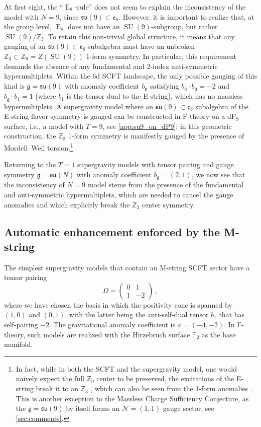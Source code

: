 \documentclass[11pt, a4paper]{article}
\newcommand*{\bbZ}{\ensuremath{\mathbb{Z}}}
\newcommand*{\bbF}{\ensuremath{\mathbb{F}}}
\newcommand*{\cN}{\ensuremath{\mathcal{N}}}
\newcommand*{\fkg}{\ensuremath{\mathfrak{g}}}
\DeclareMathOperator{\SU}{SU}
\DeclareMathOperator{\gE}{E}
\newcommand*{\fksu}{\ensuremath{\mathfrak{su}}}
\newcommand*{\fke}{\ensuremath{\mathfrak{e}}}
\begin{document}
At first sight, the ``$\gE_8$-rule'' does not seem to explain the inconsistency of the model with $N=9$, since $\fksu(9) \subset \fke_8$.
However, it is important to realize that, at the group level, $\gE_8$ does not have an $\SU(9)$-subgroup, but rather $\SU(9)/\bbZ_3$.
To retain this non-trivial global structure, it means that any gauging of an $\fksu(9) \subset \fke_8$ subalgebra must have an unbroken $\bbZ_3 \subset \bbZ_9 = Z(\SU(9))$ 1-form symmetry.
In particular, this requirement demands the absence of any fundamental and 2-index anti-symmetric hypermultiplets.
Within the 6d SCFT landscape, the only possible gauging of this kind is $\fkg = \fksu(9)$ with anomaly coefficient $b_\fkg$ satisfying $b_\fkg \cdot b_\fkg = -2$ and $b_\fkg \cdot b_1 = 1$ (where $b_1$ is the tensor dual to the E-string), which has no massless hypermultiplets.
A supergravity model where an $\fksu(9) \subset \fke_8$ subalgebra of the E-string flavor symmetry is gauged can be constructed in F-theory on a dP$_9$ surface, i.e., a model with $T=9$, see \cref{app:su9_on_dP9}; in this geometric construction, the $\bbZ_3$ 1-form symmetry is manifestly gauged by the presence of Mordell--Weil torsion.\footnote{In fact, while in both the SCFT and the supergravity model, one would naively expect the full $\bbZ_9$ center to be preserved, the excitations of the E-string break it to an $\bbZ_3$ \cite{Bhardwaj:2020phs}, which can also be seen from the 1-form anomalies \cite{Apruzzi:2020zot}.
This is another exception to the Massless Charge Sufficiency Conjecture, as the $\fkg = \fksu(9)$ by itself forms an $\cN = (1,1)$ gauge sector, see \cref{sec:comments}.
}


Returning to the $T=1$ supergravity models with tensor pairing  and gauge symmetry $\fkg = \fksu(N)$ with anomaly coefficient $b_\fkg=(2,1)$, we now see that the inconsistency of $N=9$ model stems from the presence of the fundamental and anti-symmetric hypermultiplets, which are needed to cancel the gauge anomalies and which explicitly break the $\bbZ_3$ center symmetry.


\subsection{Automatic enhancement enforced by the M-string}

The simplest supergravity models that contain an M-string SCFT sector have a tensor pairing
\begin{equation}\label{eq:tensor_charge_lattice_F2}
    \Omega = \begin{pmatrix}
        0 & 1 \\
        1 & -2
    \end{pmatrix} \, ,
\end{equation}
where we have chosen the basis in which the positivity cone is spanned by $(1,0)$ and $(0,1)$, with the latter being the anti-self-dual tensor $b_1$ that has self-pairing $-2$.
The gravitational anomaly coefficient is $a = (-4,-2)$.
In F-theory, such models are realized with the Hirzebruch surface $\bbF_2$ as the base manifold.
\end{document}
